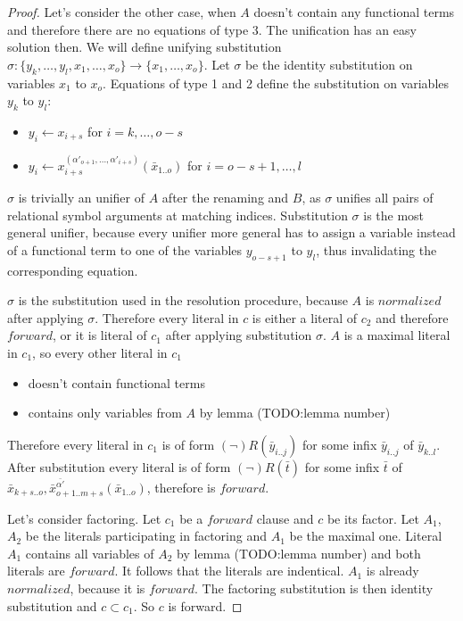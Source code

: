 \documentclass[english, shortabstract]{iithesis}
\theoremstyle{definition} \newtheorem{definition}{Definition}[chapter]
\theoremstyle{remark} \newtheorem{remark}[definition]{Observation}
\theoremstyle{plain} \newtheorem{theorem}[definition]{Theorem}
\theoremstyle{plain} \newtheorem{lemma}[definition]{Lemma}
\begin{document}
\begin{proof}
Let's consider the other case, when $A$ doesn't contain any functional terms and therefore there are no equations of type 3.
The unification has an easy solution then.%
We will define unifying substitution $\sigma : \{y_k,\dots,y_l, x_1, \dots, x_o\} \rightarrow \{x_1, \dots, x_o\}$.
Let $\sigma$ be the identity substitution on variables $x_1$ to $x_o$.
Equations of type 1 and 2 define the substitution on variables $y_k$ to $y_l$:
\begin{itemize}
    \item $y_i \leftarrow x_{i+s}$ for $i=k,\dots, o-s$
    \item $y_i \leftarrow x^{(\alpha'_{o+1}, \dots, \alpha'_{i+s})}_{i+s}(\bar{x}_{1..o})$ for $i=o-s+1,\dots, l$
\end{itemize}
$\sigma$ is trivially an unifier of $A$ after the renaming and $B$, as
$\sigma$ unifies all pairs of relational symbol arguments at matching indices.
Substitution $\sigma$ is the most general unifier, because every unifier more general
has to assign a variable instead of a functional term to one of the variables $y_{o-s+1}$ to $y_l$, 
thus invalidating the corresponding equation. 

$\sigma$ is the substitution used in the resolution procedure, because $A$ is $normalized$ after applying $\sigma$.
Therefore every literal in $c$ is either a literal of $c_2$ and therefore $forward$, or it is 
literal of $c_1$ after applying substitution $\sigma$.
$A$ is a maximal literal in $c_1$, so every other literal in $c_1$ 
\begin{itemize}
    \item doesn't contain functional terms
    \item contains only variables from $A$ by lemma (TODO:lemma number)
\end{itemize}
Therefore every literal in $c_1$ is of form $(\lnot)R(\bar{y}_{i..j})$ for some infix $\bar{y}_{i..j}$ of $\bar{y}_{k..l}$.
After substitution every literal is of form $(\lnot)R(\bar{t})$ for some infix $\bar{t}$ of $\bar{x}_{k+s..o}, \bar{x}^{\bar{\alpha'}}_{{o+1..m+s}}(\bar{x}_{1..o})$, therefore is $forward$.

\par Let's consider factoring. Let $c_1$ be a $forward$ clause and $c$ be its factor.
Let $A_1$, $A_2$ be the literals participating in factoring and $A_1$ be the maximal one.
Literal $A_1$ contains all variables of $A_2$ by lemma (TODO:lemma number) and both literals are $forward$. 
It follows that the literals are indentical. $A_1$ is already $normalized$, because it is $forward$.
The factoring substitution is then identity substitution and $c\subset c_1$. So $c$ is forward.
\end{proof}
\end{document}
